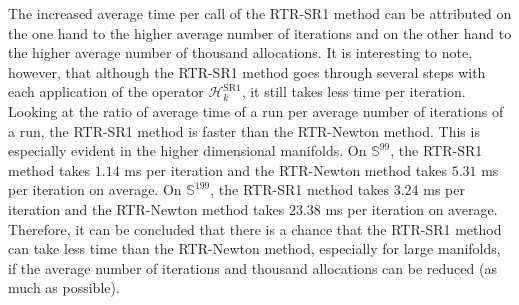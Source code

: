The increased average time per call of the RTR-SR1 method can be attributed on the one hand to the higher average number of iterations and on the other hand to the higher average number of thousand allocations. It is interesting to note, however, that although the RTR-SR1 method goes through several steps with each application of the operator $\mathcal{H}^{\mathrm{SR1}}_k$, it still takes less time per iteration. Looking at the ratio of average time of a run per average number of iterations of a run, the RTR-SR1 method is faster than the RTR-Newton method. This is especially evident in the higher dimensional manifolds. On $\mathbb{S}^{99}$, the RTR-SR1 method takes $1.14$ ms per iteration and the RTR-Newton method takes $5.31$ ms per iteration on average. On $\mathbb{S}^{199}$, the RTR-SR1 method takes $3.24$ ms per iteration and the RTR-Newton method takes $23.38$ ms per iteration on average. \\
Therefore, it can be concluded that there is a chance that the RTR-SR1 method can take less time than the RTR-Newton method, especially for large manifolds, if the average number of iterations and thousand allocations can be reduced (as much as possible).
